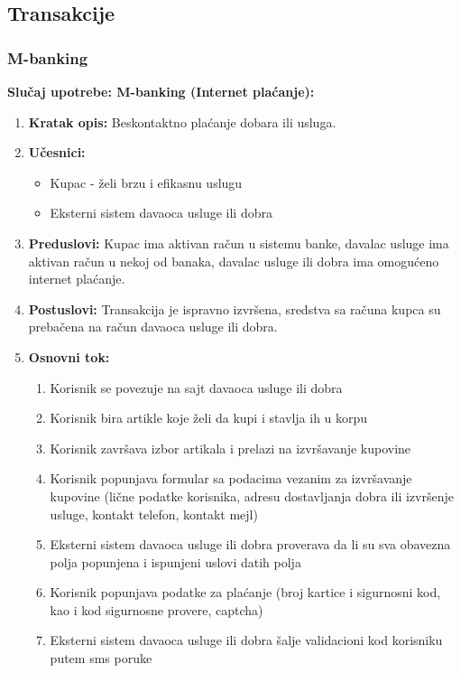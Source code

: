 \documentclass{article}
\begin{document}
\subsection{Transakcije}
\subsubsection{M-banking}

\textbf{Slučaj upotrebe: M-banking (Internet plaćanje):}
\begin{enumerate}
  \item \textbf{Kratak opis: }
  Beskontaktno plaćanje dobara ili usluga.
  \item \textbf{Učesnici: }
    \begin{itemize}
        \item Kupac - želi brzu i efikasnu uslugu
        \item Eksterni sistem davaoca usluge ili dobra
     \end{itemize}
  \item \textbf{Preduslovi: }
    Kupac ima aktivan račun u sistemu banke, davalac usluge ima aktivan račun u nekoj od banaka, davalac usluge ili dobra ima omogućeno internet plaćanje.
  \item \textbf{Postuslovi: }
    Transakcija je ispravno izvršena, sredstva sa računa kupca su prebačena na račun davaoca usluge ili dobra.
  \item \textbf{Osnovni tok: }
    \begin{enumerate}
        \item Korisnik se povezuje na sajt davaoca usluge ili dobra
        \item Korisnik bira artikle koje želi da kupi i stavlja ih u korpu
        \item Korisnik završava izbor artikala i prelazi na izvršavanje kupovine
        \item Korisnik popunjava formular sa podacima vezanim za izvršavanje kupovine (lične podatke korisnika, adresu dostavljanja dobra ili izvršenje usluge, kontakt telefon, kontakt mejl)
        \item Eksterni sistem davaoca usluge ili dobra proverava da li su sva obavezna polja popunjena i ispunjeni uslovi datih polja
        \item Korisnik popunjava podatke za plaćanje (broj kartice i sigurnosni kod, kao i kod sigurnosne provere, captcha)
        \item Eksterni sistem davaoca usluge ili dobra šalje validacioni kod korisniku putem sms poruke

\end{enumerate}
\end{enumerate}
\end{document}
